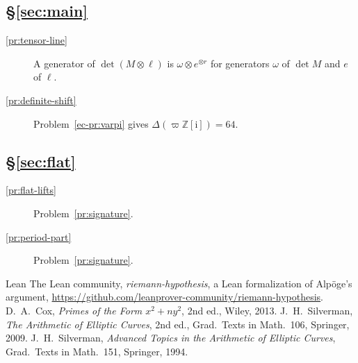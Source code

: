 \documentclass[reqno]{amsart}
\theoremstyle{definition}
\theoremstyle{plain}
\theoremstyle{remark}
\newcommand{\Z}{\mathbb Z}
\newcommand{\ii}{\mathrm i}
\begin{document}
\subsection*{\S\ref{sec:main}}
\begin{description}
\item[\ref{pr:tensor-line}] A generator of \(\det(M \otimes \ell)\) is \(\omega \otimes e^{\otimes r}\) for generators \(\omega\) of \(\det M\) and \(e\) of \(\ell\).
\item[\ref{pr:definite-shift}] Problem~\ref{ec-pr:varpi} gives \(\Delta(\varpi\Z[\ii]) = 64\).
\end{description}

\subsection*{\S\ref{sec:flat}}
\begin{description}
\item[\ref{pr:flat-lifts}] Problem~\ref{pr:signature}.
\item[\ref{pr:period-part}] Problem~\ref{pr:signature}.
\end{description}

\begin{thebibliography}{Lean}
 The Lean community, \emph{riemann-hypothesis}, a Lean formalization of Alp\"oge's argument, \url{https://github.com/leanprover-community/riemann-hypothesis}.
 D.~A.~Cox, \emph{Primes of the Form \(x^2 + ny^2\)}, 2nd ed., Wiley, 2013.
 J.~H.~Silverman, \emph{The Arithmetic of Elliptic Curves}, 2nd ed., Grad.\ Texts in Math.\ 106, Springer, 2009.
 J.~H.~Silverman, \emph{Advanced Topics in the Arithmetic of Elliptic Curves}, Grad.\ Texts in Math.\ 151, Springer, 1994.
\end{thebibliography}
\end{document}
